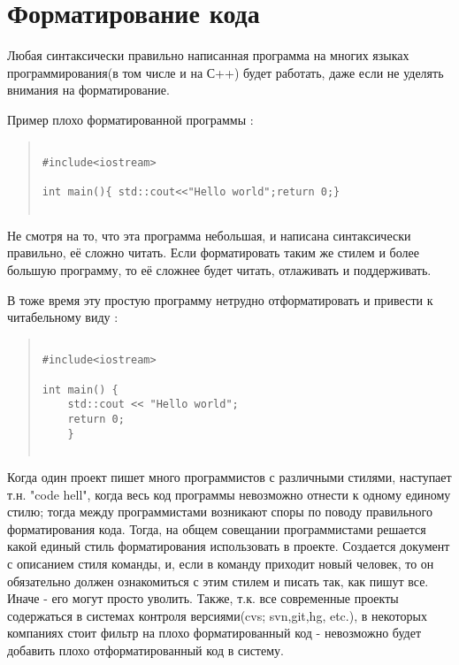\chapter{  Форматирование кода }

Любая синтаксически правильно написанная программа на многих языках программирования(в том числе и на С++) будет работать, даже если не уделять внимания на форматирование.

Пример плохо форматированной программы :

\begin{quote}
\begin{verbatim}
 
#include<iostream>

int main(){ std::cout<<"Hello world";return 0;}
 
\end{verbatim}
\end{quote}

Не смотря на то, что эта программа небольшая, и написана синтаксически правильно, её сложно читать. Если форматировать таким же стилем и более большую программу, то её сложнее будет читать, отлаживать и поддерживать.

В тоже время эту простую программу нетрудно отформатировать и привести к читабельному виду :

\begin{quote}
\begin{verbatim}
 
#include<iostream>

int main() { 
    std::cout << "Hello world";
    return 0;
    }
 
\end{verbatim}
\end{quote}

Когда один проект пишет много программистов с различными стилями, наступает т.н. "code hell", когда весь код программы невозможно отнести к одному единому стилю; тогда между программистами возникают споры по поводу правильного форматирования кода. Тогда, на общем совещании программистами решается какой единый стиль форматирования использовать в проекте. Создается документ с описанием стиля команды, и, если в команду приходит новый человек, то он обязательно должен ознакомиться с этим стилем и писать так, как пишут все. Иначе - его могут просто уволить. 
Также, т.к. все современные проекты содержаться в системах контроля версиями(cvs; svn,git,hg, etc.), в некоторых компаниях стоит фильтр на плохо форматированный код - невозможно будет добавить плохо отформатированный код в систему. 

